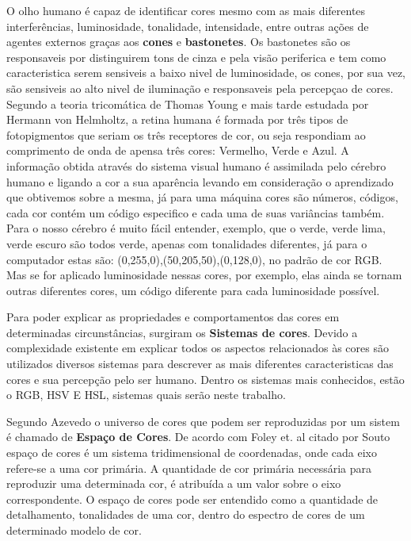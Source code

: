 O olho humano é capaz de identificar cores mesmo com as mais diferentes interferências, luminosidade, tonalidade, intensidade, entre outras ações de agentes externos graças aos \textbf{cones} e \textbf{bastonetes}. Os bastonetes são os responsaveis por distinguirem tons de cinza e pela visão periferica e tem como caracteristica serem sensiveis a baixo nivel de luminosidade\cite{Azevedo:2003}, os cones, por sua vez, são sensiveis ao alto nivel de iluminação e responsaveis pela percepçao de cores\cite{Azevedo:2003}. Segundo a teoria tricomática de Thomas Young e mais tarde estudada por Hermann von Helmholtz\cite{Azevedo:2003}, a retina humana é formada por três tipos de fotopigmentos que seriam os três receptores de cor, ou seja respondiam ao comprimento de onda de apensa três cores: Vermelho, Verde e Azul. A informação obtida através do sistema visual humano é assimilada pelo cérebro humano e ligando a cor a sua aparência levando em consideração o aprendizado que obtivemos sobre a mesma, já para uma máquina cores são números, códigos, cada cor contém um código especifico e cada uma de suas variâncias também. Para o nosso cérebro é muito fácil entender, exemplo, que o verde, verde lima, verde escuro são todos verde, apenas com tonalidades diferentes, já para o computador estas são: (0,255,0),(50,205,50),(0,128,0), no padrão de cor RGB. Mas se for aplicado luminosidade nessas cores, por exemplo, elas ainda se tornam outras diferentes cores, um código diferente para cada luminosidade possível.




Para poder explicar as propriedades e comportamentos das cores em determinadas circunstâncias, surgiram os \textbf{Sistemas de cores}. Devido a complexidade existente em explicar todos os aspectos relacionados às cores são utilizados diversos sistemas para descrever as mais diferentes caracteristicas das cores e sua percepção pelo ser humano\cite{Azevedo:2003}.  Dentro os sistemas mais conhecidos, estão o RGB, HSV E HSL, sistemas quais serão neste trabalho.

Segundo Azevedo\cite{Azevedo:2003} o universo de cores que podem ser reproduzidas por um sistem é chamado de \textbf{Espaço de Cores}. De acordo com Foley et. al citado por Souto\cite{Souto:2003} espaço de cores é um sistema tridimensional de coordenadas, onde cada eixo refere-se a uma cor primária. A quantidade de cor primária
necessária para reproduzir uma determinada cor, é atribuída a um valor sobre o eixo
correspondente. O espaço de cores pode ser entendido como a quantidade de detalhamento, tonalidades de uma cor, dentro do espectro de cores de um determinado modelo de cor.

